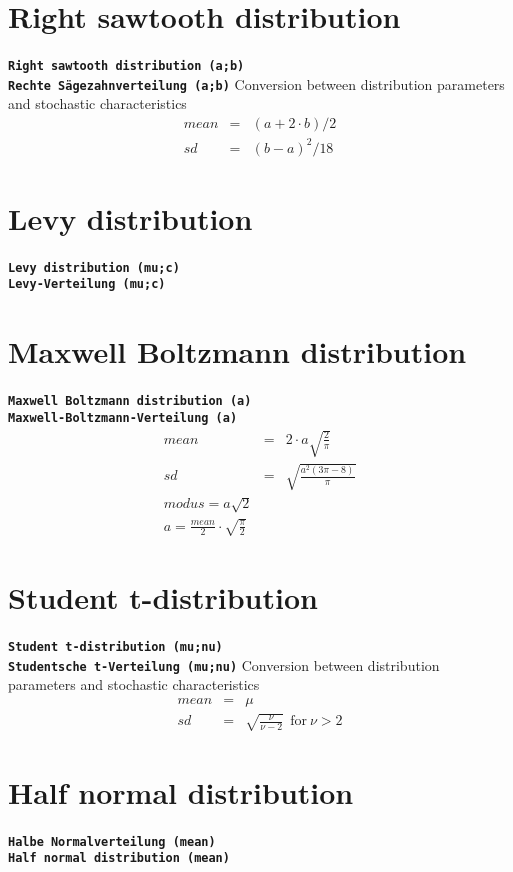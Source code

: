 \documentclass{svmono}
\def\cm#1{\textbf{\texttt{#1}}}
\begin{document}
\section*{Right sawtooth distribution}
\cm{Right sawtooth distribution (a;b)}~\\
\cm{Rechte Sägezahnverteilung (a;b)}
Conversion between distribution parameters and stochastic characteristics
\begin{eqnarray*}
mean&=&(a+2\cdot b)/2\\
sd&=&(b-a)^2/18
\end{eqnarray*}





\section*{Levy distribution}
\cm{Levy distribution (mu;c)}~\\
\cm{Levy-Verteilung (mu;c)}





\section*{Maxwell Boltzmann distribution}
\cm{Maxwell Boltzmann distribution (a)}~\\
\cm{Maxwell-Boltzmann-Verteilung (a)}
\begin{eqnarray*}
mean&=&2\cdot a\sqrt{\frac{2}{\pi}}\\
sd&=&\sqrt{\frac{a^2(3\pi-8)}{\pi}}\\
modus=a\sqrt{2}\\
a=\frac{mean}{2}\cdot\sqrt{\frac{\pi}{2}}
\end{eqnarray*}





\section*{Student t-distribution}
\cm{Student t-distribution (mu;nu)}~\\
\cm{Studentsche t-Verteilung (mu;nu)}
Conversion between distribution parameters and stochastic characteristics
\begin{eqnarray*}
mean&=&\mu\\
sd&=&\sqrt{\frac{\nu}{\nu-2}}~~\textrm{for}~\nu>2
\end{eqnarray*}


\section*{Half normal distribution}
\cm{Halbe Normalverteilung (mean)}~\\
\cm{Half normal distribution (mean)}
\end{document}
